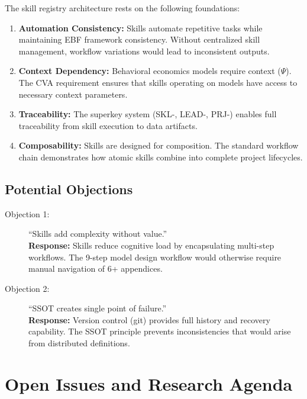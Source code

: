 The skill registry architecture rests on the following foundations:

\begin{enumerate}
\item \textbf{Automation Consistency:} Skills automate repetitive tasks while maintaining
EBF framework consistency. Without centralized skill management, workflow variations
would lead to inconsistent outputs.

\item \textbf{Context Dependency:} Behavioral economics models require context ($\Psi$).
The CVA requirement ensures that skills operating on models have access to necessary
context parameters.

\item \textbf{Traceability:} The superkey system (SKL-, LEAD-, PRJ-) enables full
traceability from skill execution to data artifacts.

\item \textbf{Composability:} Skills are designed for composition. The standard workflow
chain demonstrates how atomic skills combine into complete project lifecycles.
\end{enumerate}

\subsection{Potential Objections}

\begin{description}
\item[Objection 1:] ``Skills add complexity without value.'' \\
\textbf{Response:} Skills reduce cognitive load by encapsulating multi-step workflows.
The 9-step model design workflow would otherwise require manual navigation of 6+ appendices.

\item[Objection 2:] ``SSOT creates single point of failure.'' \\
\textbf{Response:} Version control (git) provides full history and recovery capability.
The SSOT principle prevents inconsistencies that would arise from distributed definitions.
\end{description}


\section{Open Issues and Research Agenda}
\label{sec:sk-open-issues}

